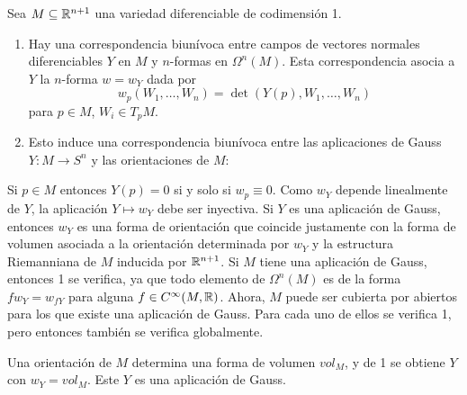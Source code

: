 \documentclass[CV.tex]{subfiles}
\begin{document}
\begin{prop}
Sea $M\subseteq\mathbb{R}^{n+1}$ una variedad diferenciable de codimensión 1.
\begin{enumerate}
\item Hay una correspondencia biunívoca entre campos de vectores normales diferenciables $Y$ en $M$ y $n$-formas en $\Omega^n(M)$. Esta correspondencia asocia a $Y$ la $n$-forma $w=w_Y$ dada por
\[
w_p(W_1,\dots, W_n)=\det(Y(p), W_1,\dots, W_n)
\]
para $p\in M$, $W_i\in T_pM$.
\item Esto induce una correspondencia biunívoca entre las aplicaciones de Gauss $Y:M\to S^n$ y las orientaciones de $M$:
\end{enumerate}
\end{prop}
\begin{dem}
Si $p\in M$ entonces $Y(p)=0$ si y solo si $w_p\equiv 0$. Como $w_Y$ depende linealmente de $Y$, la aplicación $Y\mapsto w_Y$ debe ser inyectiva. Si $Y$ es una aplicación de Gauss, entonces $w_Y$ es una forma de orientación que coincide justamente con la forma de volumen asociada a la orientación determinada por $w_Y$ y la estructura Riemanniana de $M$ inducida por $\mathbb{R}^{n+1}$. Si $M$ tiene una aplicación de Gauss, entonces 1 se verifica, ya que todo elemento de $\Omega^n(M)$ es de la forma $fw_Y=w_{fY}$ para alguna $f\in C^{\infty}(M,\mathbb{R})$. Ahora, $M$ puede ser cubierta por abiertos para los que existe una aplicación de Gauss. Para cada uno de ellos se verifica 1, pero entonces también se verifica globalmente.

Una orientación de $M$ determina una forma de volumen $vol_M$, y de 1 se obtiene $Y$ con $w_Y=vol_M$. Este $Y$ es una aplicación de Gauss. 
\QED
\end{dem}
\end{document}
